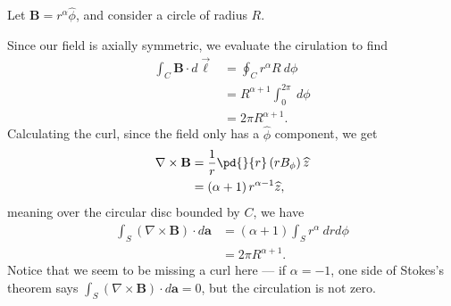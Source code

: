 \documentclass[10pt]{mypackage}
\begin{document}
\begin{example}
  Let $\mathbf{B} = r^{\alpha}\widehat{\phi}$, and consider a circle of radius $R$.\newline

  Since our field is axially symmetric, we evaluate the cirulation to find
  \begin{align*}
    \int_{C}^{} \mathbf{B}\cdot d\vec{\ell} &= \oint_{C}^{} r^{\alpha}R\:d\phi\\
                                            &= R^{\alpha + 1}\int_{0}^{2\pi} \:d\phi\\
                                            &= 2\pi R^{\alpha + 1}.
  \end{align*}
  Calculating the curl, since the field only has a $\widehat{\phi}$ component, we get
  \begin{align*}
    \nabla \times \mathbf{B} &= \frac{1}{r}\pd{}{r}\left(rB_{\phi}\right)\widehat{z}\\
                             &= \left(\alpha + 1\right)r^{\alpha - 1}\widehat{z},
  \end{align*}
  meaning over the circular disc bounded by $C$, we have
  \begin{align*}
    \int_{S}^{} \left(\nabla \times \mathbf{B}\right)\cdot d\mathbf{a} &= \left(\alpha + 1\right)\int_{S}^{} r^{\alpha}\:drd\phi\\
                                                                       &= 2\pi R^{\alpha + 1}.
  \end{align*}
  Notice that we seem to be missing a curl here --- if $\alpha = -1$, one side of Stokes's theorem says $\int_{S}^{} \left(\nabla \times \mathbf{B}\right)\cdot d\mathbf{a} = 0$, but the circulation is not zero.
\end{example}
\end{document}
